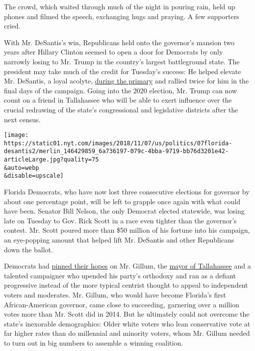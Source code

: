 The crowd, which waited through much of the night in pouring rain, held
up phones and filmed the speech, exchanging hugs and praying. A few
supporters cried.

With Mr. DeSantis's win, Republicans held onto the governor's mansion
two years after Hillary Clinton seemed to open a door for Democrats by
only narrowly losing to Mr. Trump in the country's largest battleground
state. The president may take much of the credit for Tuesday's success:
He helped elevate Mr. DeSantis, a loyal acolyte,
\href{https://www.nytimes.com/2018/07/30/us/politics/florida-governor-election.html}{during
the primary} and rallied twice for him in the final days of the
campaign. Going into the 2020 election, Mr. Trump can now count on a
friend in Tallahassee who will be able to exert influence over the
crucial redrawing of the state's congressional and legislative districts
after the next census.

\texttt{[image: https://static01.nyt.com/images/2018/11/07/us/politics/07florida-desantis2/merlin\_146429859\_6a736197-079c-4bba-9719-bb76d3201e42-articleLarge.jpg?quality=75\\\&auto=webp\\\&disable=upscale]}

Florida Democrats, who have now lost three consecutive elections for
governor by about one percentage point, will be left to grapple once
again with what could have been. Senator Bill Nelson, the only Democrat
elected statewide, was losing late on Tuesday to Gov. Rick Scott in a
race even tighter than the governor's contest. Mr. Scott poured more
than \$50 million of his fortune into his campaign, an eye-popping
amount that helped lift Mr. DeSantis and other Republicans down the
ballot.

Democrats had
\href{https://www.nytimes.com/2018/11/05/us/politics/florida-andrew-gillum-ron-desantis-bill-nelson.html}{pinned
their hopes} on Mr. Gillum, the
\href{https://www.nytimes.com/2018/10/18/us/politics/andrew-gillum-florida-governor.html}{mayor
of Tallahassee} and a talented campaigner who upended his party's
orthodoxy and ran as a defiant progressive instead of the more typical
centrist thought to appeal to independent voters and moderates. Mr.
Gillum, who would have become Florida's first African-American governor,
came close to succeeding, garnering over a million votes more than Mr.
Scott did in 2014. But he ultimately could not overcome the state's
inexorable demographics: Older white voters who lean conservative vote
at far higher rates than do millennial and minority voters, whom Mr.
Gillum needed to turn out in big numbers to assemble a winning
coalition.

